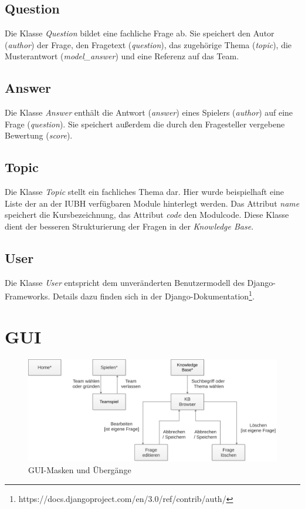 \documentclass[a4paper,11pt,listof=numbered,glossary=totoc,parskip=half,toc=bib]{scrreprt}
\begin{document}
	\subsection{Question}
	Die Klasse \textit{Question} bildet eine fachliche Frage ab. Sie speichert den Autor (\textit{author}) der Frage, den Fragetext (\textit{question}), das zugehörige Thema (\textit{topic}), die Musterantwort (\textit{model\_{}answer}) und eine Referenz auf das Team.
	
	\subsection{Answer}
	Die Klasse \textit{Answer} enthält die Antwort (\textit{answer}) eines Spielers (\textit{author}) auf eine Frage (\textit{question}). Sie speichert außerdem die durch den Fragesteller vergebene Bewertung (\textit{score}).
	
	\subsection{Topic}
	Die Klasse \textit{Topic} stellt ein fachliches Thema dar. Hier wurde beispielhaft eine Liste der an der IUBH verfügbaren Module hinterlegt werden. Das Attribut \textit{name} speichert die Kursbezeichnung, das Attribut \textit{code} den Modulcode. Diese Klasse dient der besseren Strukturierung der Fragen in der \textit{Knowledge Base}.

	\subsection{User}
	Die Klasse \textit{User} entspricht dem unveränderten Benutzermodell des Django-Frameworks. Details dazu finden sich in der Django-Dokumentation\footnote{https://docs.djangoproject.com/en/3.0/ref/contrib/auth/}.	
	
	\section{GUI}
	
	\begin{figure}
		\centering
		\includegraphics[width=\textwidth]{gui.png}
		\caption{GUI-Masken und Übergänge}
		\label{fig:gui}
	\end{figure}
	
\end{document}
